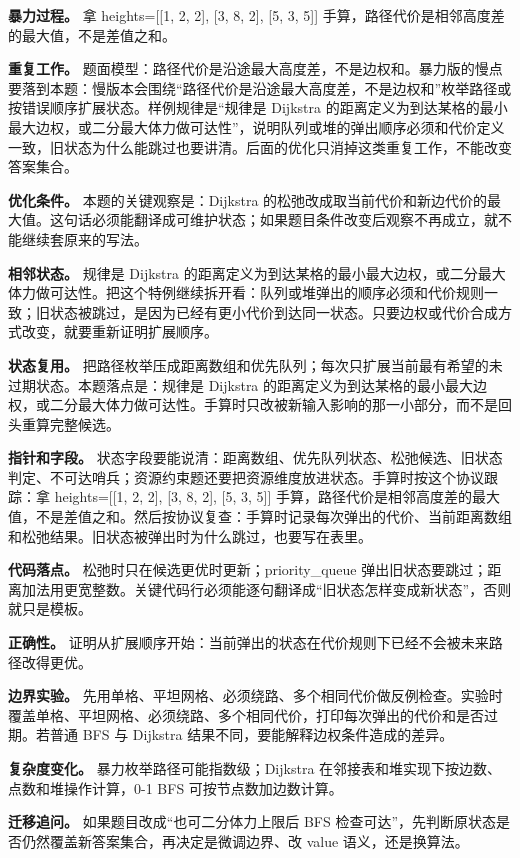 \textbf{暴力过程。} 拿 heights=[[1, 2, 2], [3, 8, 2], [5, 3, 5]] 手算，路径代价是相邻高度差的最大值，不是差值之和。

\textbf{重复工作。} 题面模型：路径代价是沿途最大高度差，不是边权和。暴力版的慢点要落到本题：慢版本会围绕“路径代价是沿途最大高度差，不是边权和”枚举路径或按错误顺序扩展状态。样例规律是“规律是 Dijkstra 的距离定义为到达某格的最小最大边权，或二分最大体力做可达性”，说明队列或堆的弹出顺序必须和代价定义一致，旧状态为什么能跳过也要讲清。后面的优化只消掉这类重复工作，不能改变答案集合。

\textbf{优化条件。} 本题的关键观察是：Dijkstra 的松弛改成取当前代价和新边代价的最大值。这句话必须能翻译成可维护状态；如果题目条件改变后观察不再成立，就不能继续套原来的写法。

\textbf{相邻状态。} 规律是 Dijkstra 的距离定义为到达某格的最小最大边权，或二分最大体力做可达性。把这个特例继续拆开看：队列或堆弹出的顺序必须和代价规则一致；旧状态被跳过，是因为已经有更小代价到达同一状态。只要边权或代价合成方式改变，就要重新证明扩展顺序。

\textbf{状态复用。} 把路径枚举压成距离数组和优先队列；每次只扩展当前最有希望的未过期状态。本题落点是：规律是 Dijkstra 的距离定义为到达某格的最小最大边权，或二分最大体力做可达性。手算时只改被新输入影响的那一小部分，而不是回头重算完整候选。

\textbf{指针和字段。} 状态字段要能说清：距离数组、优先队列状态、松弛候选、旧状态判定、不可达哨兵；资源约束题还要把资源维度放进状态。手算时按这个协议跟踪：拿 heights=[[1, 2, 2], [3, 8, 2], [5, 3, 5]] 手算，路径代价是相邻高度差的最大值，不是差值之和。然后按协议复查：手算时记录每次弹出的代价、当前距离数组和松弛结果。旧状态被弹出时为什么跳过，也要写在表里。

\textbf{代码落点。} 松弛时只在候选更优时更新；priority\_queue 弹出旧状态要跳过；距离加法用更宽整数。关键代码行必须能逐句翻译成“旧状态怎样变成新状态”，否则就只是模板。

\textbf{正确性。} 证明从扩展顺序开始：当前弹出的状态在代价规则下已经不会被未来路径改得更优。

\textbf{边界实验。} 先用单格、平坦网格、必须绕路、多个相同代价做反例检查。实验时覆盖单格、平坦网格、必须绕路、多个相同代价，打印每次弹出的代价和是否过期。若普通 BFS 与 Dijkstra 结果不同，要能解释边权条件造成的差异。

\textbf{复杂度变化。} 暴力枚举路径可能指数级；Dijkstra 在邻接表和堆实现下按边数、点数和堆操作计算，0-1 BFS 可按节点数加边数计算。

\textbf{迁移追问。} 如果题目改成“也可二分体力上限后 BFS 检查可达”，先判断原状态是否仍然覆盖新答案集合，再决定是微调边界、改 value 语义，还是换算法。

